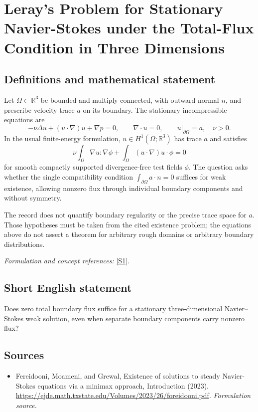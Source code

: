 \documentclass[11pt]{article}
\begin{document}
\section*{\texorpdfstring{Leray's Problem for Stationary Navier-Stokes under the Total-Flux Condition in Three Dimensions}{Leray's Problem for Stationary Navier-Stokes under the Total-Flux Condition in Three Dimensions}}\label{461}
\subsection{Definitions and mathematical statement}
Let $\Omega\subset{\mathbb{R}}^3$ be bounded and multiply connected, with outward normal $n$, and prescribe velocity trace $a$ on its boundary. The stationary incompressible equations are
\[
 -\nu\Delta u+(u\cdot\nabla)u+\nabla p=0,
 \qquad\nabla\cdot u=0,\qquad u|_{\partial\Omega}=a,
 \quad\nu>0.
\]
In the usual finite-energy formulation, $u\in H^1(\Omega;{\mathbb{R}}^3)$ has trace $a$ and satisfies
\[
 \nu\int_\Omega\nabla u:\nabla\phi
 +\int_\Omega (u\cdot\nabla)u\cdot\phi=0
\]
for smooth compactly supported divergence-free test fields $\phi$. The question asks whether the single compatibility condition $\int_{\partial\Omega}a\cdot n=0$ suffices for weak existence, allowing nonzero flux through individual boundary components and without symmetry.

The record does not quantify boundary regularity or the precise trace space for $a$. Those hypotheses must be taken from the cited existence problem; the equations above do not assert a theorem for arbitrary rough domains or arbitrary boundary distributions.
\par\smallskip\textit{Formulation and concept references:} \href{https://ejde.math.txstate.edu/Volumes/2023/26/foreidooni.pdf}{[S1]}.

\subsection{Short English statement}
Does zero total boundary flux suffice for a stationary three-dimensional Navier--Stokes weak solution, even when separate boundary components carry nonzero flux?
\subsection{Sources}
\begin{itemize}
\item[S1]Fereidooni, Moameni, and Grewal, Existence of solutions to steady Navier-Stokes equations via a minimax approach, Introduction (2023).
\url{https://ejde.math.txstate.edu/Volumes/2023/26/foreidooni.pdf}.
\textit{Formulation source.}
\end{itemize}
\end{document}

